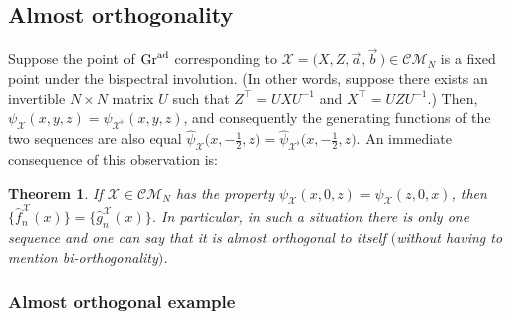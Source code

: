 \documentclass[10pt,a4paper]{amsart}
\numberwithin{equation}{section}
\newtheorem{Theorem}{Theorem}[section]
\theoremstyle{definition}
\def\X{\mathcal{X}}
\def\CM{\mathcal{C\!M}}
\def\ff{\hat f}
\def\gg{\hat g}
\begin{document}
\subsection{Almost orthogonality}
Suppose the point of ${\rm Gr}^{\rm ad}$ corresponding to $\X=\bigl(X,Z,\vec a,\vec
b\,\bigr)\in\CM_N$
is a fixed point under the bispectral involution. (In
other words, suppose there exists an invertible $N\times N$ matrix $U$
such that $Z^{\top}=UXU^{-1}$ and $X^{\top}=UZU^{-1}$.)
Then,
$\psi_{\X}(x,y,z)=\psi_{\X^\flat}(x,y,z)$, and consequently the
generating functions of the two sequences are also equal
$
\hat\psi_{\X}\bigl(x,-\tfrac{1}{2},z\bigr)=\hat\psi_{\X^\flat}\bigl(x,-\tfrac{1}{2},z\bigr)$.
An immediate consequence of this observation is:

\begin{Theorem}\label{thm:almostorthog}
 If $\X\in\CM_N$
 has the property $\psi_{\X}(x,0,z)=\psi_{\X}(z,0,x)$,
 then $\big\{\ff_n^{\X}(x)\big\}=\big\{\gg_n^{\X}(x)\big\}$. In particular, in such a
 situation there is only one sequence and one can say that it is
 almost orthogonal to itself $($without having to mention \textit{bi}-orthogonality$)$.
\end{Theorem}

\subsubsection{Almost orthogonal example}\label{subsec:almostorthogexamp}
\end{document}
